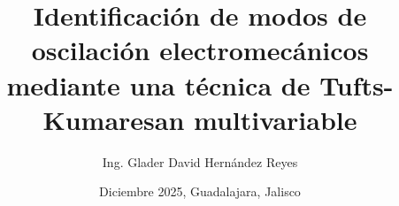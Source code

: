 \documentclass[letterpaper,12pt,twoside,openright,notitlepage,final]{UDG_thesis}
\title{Identificación de modos de oscilación electromecánicos mediante una técnica de
Tufts-Kumaresan multivariable}
\author{Ing. Glader David Hernández Reyes}
\date{Diciembre 2025, Guadalajara, Jalisco}
\begin{document}
	
 
\graphicspath{{./Capitulos/Figuras/}}	%
\maketitle  
{}            %
\end{document}
